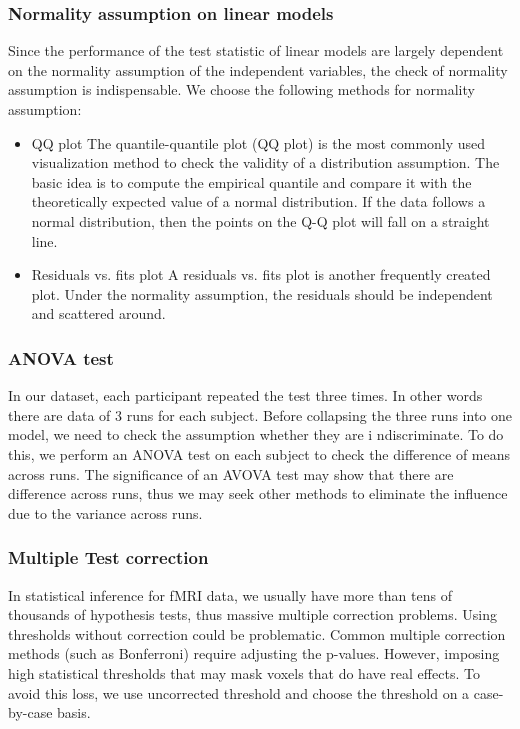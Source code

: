 \documentclass[11pt]{article}
\begin{document}
\subsubsection{Normality assumption on linear models}

Since the performance of the test statistic of linear models are largely 
dependent on the normality assumption of the independent variables, the check of 
normality assumption is indispensable. We choose the following methods for 
normality assumption:

\begin{itemize}
\item{QQ plot} The quantile-quantile plot (QQ plot) is the most commonly used 
visualization method to check the validity of a distribution assumption. The 
basic idea is to compute the empirical quantile and compare it with the 
theoretically expected value of a normal distribution. If the data follows a 
normal distribution, then the points on the Q-Q plot will fall on a straight 
line. 
\item{Residuals vs. fits plot} A residuals vs. fits plot is another
frequently created plot. Under the normality assumption, the residuals should 
be independent and scattered around.
\end{itemize}

\subsubsection{ANOVA test}

In our dataset, each participant repeated the test three times. In other 
words there are data of 3 runs for each subject. Before collapsing the three 
runs into one model, we need to check the assumption whether they are i
ndiscriminate.  To do this, we perform an ANOVA test on each subject to check 
the difference of means across runs. The significance of an AVOVA test may 
show that there are difference across runs, thus we may seek other methods to 
eliminate the influence due to the variance across runs.

\subsubsection{Multiple Test correction}

In statistical inference for fMRI data, we usually have more than tens of 
thousands of hypothesis tests, thus massive multiple correction problems. 
Using thresholds without correction could be problematic. Common multiple 
correction methods (such as Bonferroni) require adjusting the p-values. 
However, imposing high statistical thresholds that may mask voxels that do have 
real effects. To avoid this loss, we use uncorrected threshold and choose the 
threshold on a case-by-case basis.
\end{document}
